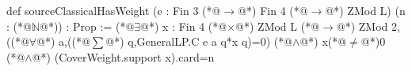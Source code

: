 def sourceClassicalHasWeight (e : Fin 3 (*@$\to$@*) Fin 4 (*@$\to$@*) ZMod L) (n : (*@$\mathbb N$@*)) : Prop :=
  (*@$\exists$@*) x : Fin 4 (*@$\times$@*) ZMod L (*@$\to$@*) ZMod 2,
    ((*@$\forall$@*) a,((*@$\sum$@*) q,GeneralLP.C e a q*x q)=0) (*@$\land$@*) x(*@$\ne$@*)0 (*@$\land$@*) (CoverWeight.support x).card=n
